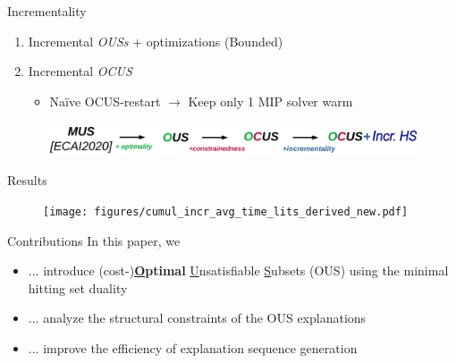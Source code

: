 \documentclass[handout]{beamer}
\begin{document}
\begin{frame}{Incrementality}
		\begin{enumerate}
			\item \color{vuborange} Incremental \emph{OUSs} + optimizations {\color{blue} (Bounded)}\pause
			\item {\color{vuborange} Incremental \emph{OCUS}}
			\begin{itemize}
				\item Naïve OCUS-restart $\rightarrow$ Keep only 1 MIP solver warm
			\end{itemize}
		\end{enumerate}
		\begin{figure}
			\includegraphics[width=\textwidth]{mus_to_ocus_i.png}
		\end{figure}
	\end{frame}


\begin{frame}{Results}
	\begin{figure}
		\texttt{[image: figures/cumul\_incr\_avg\_time\_lits\_derived\_new.pdf]}
	\end{figure}
\end{frame}
	
	\begin{frame}{Contributions}
		\vfill
		In this paper, we
		\vfill
		\begin{itemize}
			\item ... introduce (cost-)\textbf{\underline{O}ptimal} \underline{U}nsatisfiable \underline{S}ubsets (OUS) using the minimal hitting set duality
			\item ... analyze the structural constraints of the OUS explanations
			\item ... improve the efficiency of explanation sequence generation
		\end{itemize}
		\vfill
	\end{frame}
	
\end{document}
